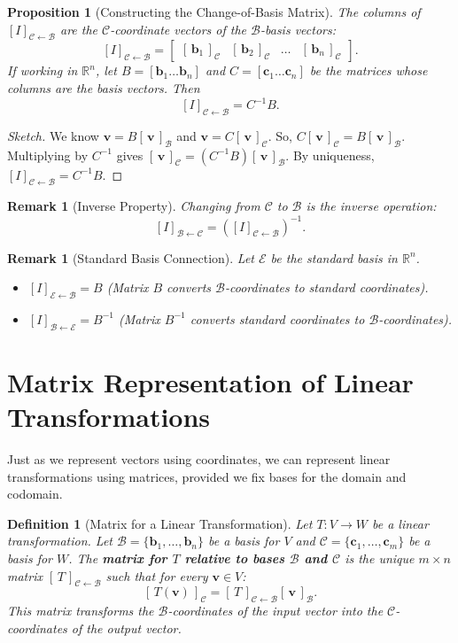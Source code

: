 \documentclass[11pt, a4paper]{article}
\theoremstyle{mytheoremstyle}
\newtheorem{proposition}[theorem]{Proposition}
\theoremstyle{mydefstyle}
\newtheorem{definition}[theorem]{Definition}
\newtheorem{remark}[theorem]{Remark}
\newcommand{\R}{\mathbb{R}}      %
\newcommand{\B}{\mathcal{B}}    %
\newcommand{\C}{\mathcal{C}}    %
\newcommand{\E}{\mathcal{E}}    %
\newcommand{\vb}{\mathbf{v}}     %
\newcommand{\bb}{\mathbf{b}}     %
\newcommand{\cb}{\mathbf{c}}     %
\newcommand{\coord}[2]{[\,#1\,]_{\mathcal{#2}}} %
\newcommand{\matrixrep}[3]{[\,#1\,]_{\mathcal{#2} \leftarrow \mathcal{#3}}} %
\newcommand{\changebasis}[2]{[I]_{\mathcal{#1} \leftarrow \mathcal{#2}}} %
\begin{document}
\begin{proposition}[Constructing the Change-of-Basis Matrix]
The columns of $\changebasis{C}{B}$ are the $\C$-coordinate vectors of the $\B$-basis vectors:
\[ \changebasis{C}{B} = \begin{bmatrix} \coord{\bb_1}{C} & \coord{\bb_2}{C} & \dots & \coord{\bb_n}{C} \end{bmatrix}. \]
If working in $\R^n$, let $B = [\bb_1 \dots \bb_n]$ and $C = [\cb_1 \dots \cb_n]$ be the matrices whose columns are the basis vectors. Then
\[ \changebasis{C}{B} = C^{-1} B. \]
\end{proposition}

\begin{proof}[Sketch]
We know $\vb = B \coord{\vb}{B}$ and $\vb = C \coord{\vb}{C}$.
So, $C \coord{\vb}{C} = B \coord{\vb}{B}$. Multiplying by $C^{-1}$ gives $\coord{\vb}{C} = (C^{-1} B) \coord{\vb}{B}$. By uniqueness, $\changebasis{C}{B} = C^{-1} B$.
\end{proof}

\begin{remark}[Inverse Property]
Changing from $\C$ to $\B$ is the inverse operation:
\[ \changebasis{B}{C} = (\changebasis{C}{B})^{-1}. \]
\end{remark}

\begin{remark}[Standard Basis Connection]
Let $\E$ be the standard basis in $\R^n$.
\begin{itemize}
    \item $\changebasis{E}{B} = B$ (Matrix $B$ converts $\B$-coordinates to standard coordinates).
    \item $\changebasis{B}{E} = B^{-1}$ (Matrix $B^{-1}$ converts standard coordinates to $\B$-coordinates).
\end{itemize}
\end{remark}

\section{Matrix Representation of Linear Transformations}

Just as we represent vectors using coordinates, we can represent linear transformations using matrices, provided we fix bases for the domain and codomain.

\begin{definition}[Matrix for a Linear Transformation]
Let $T: V \to W$ be a linear transformation. Let $\B = \{\bb_1, \dots, \bb_n\}$ be a basis for $V$ and $\C = \{\cb_1, \dots, \cb_m\}$ be a basis for $W$. The \textbf{matrix for $T$ relative to bases $\B$ and $\C$} is the unique $m \times n$ matrix $\matrixrep{T}{C}{B}$ such that for every $\vb \in V$:
\[ \coord{T(\vb)}{C} = \matrixrep{T}{C}{B} \coord{\vb}{B}. \]
This matrix transforms the $\B$-coordinates of the input vector into the $\C$-coordinates of the output vector.
\end{definition}
\end{document}
